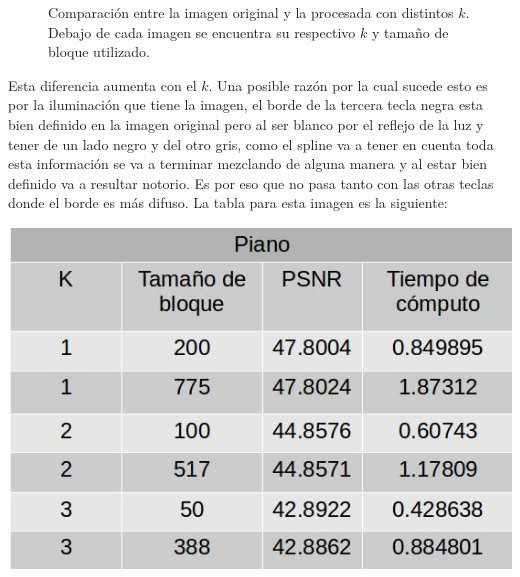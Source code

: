 \documentclass[a4paper]{article}
\begin{document}
\begin{figure}[H]
{}
\caption{Comparación entre la imagen original y la procesada con distintos $k$. Debajo de cada imagen se encuentra su respectivo $k$ y tamaño de bloque utilizado.}
\end{figure}

Esta diferencia aumenta con el $k$. Una posible razón por la cual sucede esto es por la iluminación que tiene la imagen, el borde de la tercera tecla negra esta bien definido en la imagen original pero al ser blanco por el reflejo de la luz y tener de un lado negro y del otro gris, como el spline va a tener en cuenta toda esta información se va a terminar mezclando de alguna manera y al estar bien definido va a resultar notorio. Es por eso que no pasa tanto con las otras teclas donde el borde es más difuso. La tabla para esta imagen es la siguiente:
\newline

\centerline{
\includegraphics[scale=0.5]{imagenes/pianoTabla.jpg}
}
\end{document}

